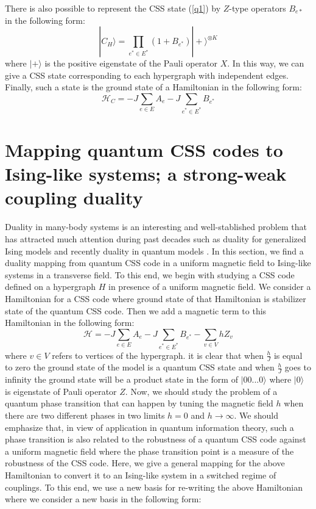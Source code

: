 \documentclass[preprintnumbers, showpacs, floatfix,twocolumn,
preprintnumbers, superscriptaddress]{revtex4}
\def\ra{\rangle}
\begin{document}
There is also possible to represent the CSS state (\ref{q1}) by $Z$-type operators $B_{e{*}}$ in the following form:
\begin{equation}\label{q2}
|C_H\ra=\prod_{e^{*} \in E^{*}}(1+B_{e^{*}} )|+\ra ^{\otimes K}
\end{equation}
where $|+\ra$ is the positive eigenstate of the Pauli operator $X$. In this way, we can give a CSS state corresponding to each hypergraph with independent edges. Finally, such a state is the ground state of a Hamiltonian in the following form:
\begin{equation}\label{cssh}
\mathcal{H}_C=-J \sum_{e\in E}A_e -J \sum_{e^{*}\in E^{*}}B_{e^{*}}
\end{equation}

\section{Mapping quantum CSS codes to Ising-like systems; a strong-weak coupling duality}\label{s3}
 Duality in many-body systems is an interesting and well-stablished problem that has attracted much attention during past decades such as duality for generalized Ising models\cite{generalized} and recently duality in quantum models \cite{gaug1, gaug2}. In this section, we find a duality mapping from quantum CSS code in a uniform magnetic field to Ising-like systems in a transverse field. To this end, we begin with studying a CSS code defined on a hypergraph $H$ in presence of a uniform magnetic field. We consider a Hamiltonian for a CSS code where ground state of that Hamiltonian is stabilizer state of the quantum CSS code. Then we add a magnetic term to this Hamiltonian in the following form:
\begin{equation}\label{init}
\mathcal{H}=-J \sum_{e\in E}A_e -J \sum_{e^{*}\in E^{*}}B_{e^{*}} -\sum_{v\in V} h Z_v
\end{equation}
where $v \in V$ refers to vertices of the hypergraph. it is clear that when $\frac{h}{J}$ is equal to zero the ground state of the model is a quantum CSS state and when $\frac{h}{J}$ goes to infinity the ground state will be a product state in the form of $|00...0\ra$ where $|0\ra$ is eigenstate of Pauli operator $Z$. Now, we should study the problem of a quantum phase transition that can happen by tuning the magnetic field $h$ when there are two different phases in two limits $h=0$ and $h\rightarrow \infty$. We should emphasize that, in view of application in quantum information theory, such a phase transition is also related to the robustness of a quantum CSS code against a uniform magnetic field where the phase transition point is a measure of the robustness of the CSS code. Here, we give a general mapping for the above Hamiltonian to convert it to an Ising-like system in a switched regime of couplings. To this end, we use a new basis for re-writing the above Hamiltonian where we consider a new basis in the following form:
\end{document}
